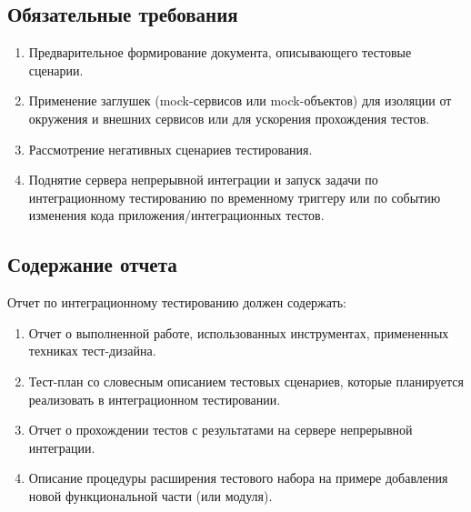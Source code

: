 \documentclass[a4paper, 14pt]{article}
\begin{document}
\subsection{Обязательные требования}

\begin{enumerate}
    \item Предварительное формирование документа, описывающего тестовые сценарии.
    \item Применение заглушек (mock-сервисов или mock-объектов) для изоляции от окружения и внешних сервисов или для ускорения прохождения тестов.
    \item Рассмотрение негативных сценариев тестирования.
    \item Поднятие сервера непрерывной интеграции и запуск задачи по интеграционному тестированию по временному триггеру или по событию изменения кода приложения/интеграционных тестов.
\end{enumerate}

\subsection{Содержание отчета}

Отчет по интеграционному тестированию должен содержать:

\begin{enumerate}
    \item Отчет о выполненной работе, использованных инструментах, примененных техниках тест-дизайна.
    \item Тест-план со словесным описанием тестовых сценариев, которые планируется реализовать в интеграционном тестировании.
    \item Отчет о прохождении тестов с результатами на сервере непрерывной интеграции.
    \item Описание процедуры расширения тестового набора на примере добавления новой функциональной части (или модуля).
\end{enumerate}
\end{document}
